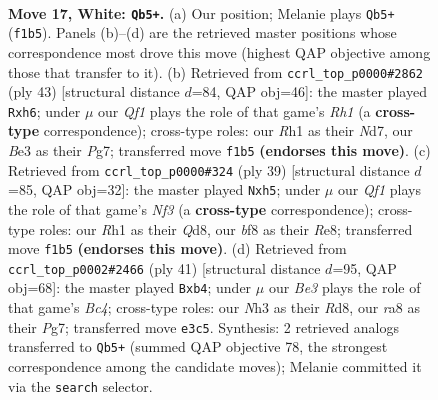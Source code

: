 \documentclass[11pt]{article}
\begin{document}
\clearpage

\begin{figure}[p]\centering
\begin{subfigure}{0.46\textwidth}\centering
\resizebox{\linewidth}{!}{%
\newchessgame
\chessboard[
  setfen={rn1qkbr1/5p2/3p1np1/2pP4/4Pp2/1PN1B2N/P2K4/R4Q1R w q - 0 17},
  showmover=false,
  pgfstyle=straightmove, color=movearrow, markmove={f1-b5}
]}
\caption{}
\end{subfigure}\hfill
\begin{subfigure}{0.46\textwidth}\centering
\resizebox{\linewidth}{!}{%
\newchessgame
\chessboard[
  setfen={4k2r/3n1pp1/rq2p2P/p1bpP2P/3B1P2/8/1PP1NQ2/R3K2R b KQk - 0 22},
  showmover=false,
  pgfstyle=straightmove, color=movearrow, markmove={h8-h6}
]}
\caption{}
\end{subfigure}
\\[4pt]
\begin{subfigure}{0.46\textwidth}\centering
\resizebox{\linewidth}{!}{%
\newchessgame
\chessboard[
  setfen={r2qr1k1/pp3pb1/5np1/3p3P/7P/2PQB3/PP1N1P2/1K1R2R1 b - - 0 20},
  showmover=false,
  pgfstyle=straightmove, color=movearrow, markmove={f6-h5}
]}
\caption{}
\end{subfigure}\hfill
\begin{subfigure}{0.46\textwidth}\centering
\resizebox{\linewidth}{!}{%
\newchessgame
\chessboard[
  setfen={3rk2r/5pp1/pq3n1p/2b1p3/1P4P1/1B5P/1PP1NP2/R3QRK1 b k - 0 21},
  showmover=false,
  pgfstyle=straightmove, color=movearrow, markmove={c5-b4}
]}
\caption{}
\end{subfigure}
\caption{\textbf{Move 17, White: \texttt{Qb5+}.} (a) Our position; Melanie plays \texttt{Qb5+} (\texttt{f1b5}). Panels (b)--(d) are the retrieved master positions whose correspondence most drove this move (highest QAP objective among those that transfer to it). (b) Retrieved from \texttt{ccrl\_top\_p0000\#2862} (ply 43) [structural distance $d$=84, QAP obj=46]: the master played \texttt{Rxh6}; under $\mu$ our \emph{Qf1} plays the role of that game's \emph{Rh1} (a \textbf{cross-type} correspondence); cross-type roles: our \emph{R}h1 as their \emph{N}d7, our \emph{B}e3 as their \emph{P}g7; transferred move \texttt{f1b5} \textbf{(endorses this move)}. (c) Retrieved from \texttt{ccrl\_top\_p0000\#324} (ply 39) [structural distance $d$=85, QAP obj=32]: the master played \texttt{Nxh5}; under $\mu$ our \emph{Qf1} plays the role of that game's \emph{Nf3} (a \textbf{cross-type} correspondence); cross-type roles: our \emph{R}h1 as their \emph{Q}d8, our \emph{b}f8 as their \emph{R}e8; transferred move \texttt{f1b5} \textbf{(endorses this move)}. (d) Retrieved from \texttt{ccrl\_top\_p0002\#2466} (ply 41) [structural distance $d$=95, QAP obj=68]: the master played \texttt{Bxb4}; under $\mu$ our \emph{Be3} plays the role of that game's \emph{Bc4}; cross-type roles: our \emph{N}h3 as their \emph{R}d8, our \emph{r}a8 as their \emph{P}g7; transferred move \texttt{e3c5}. Synthesis: 2 retrieved analogs transferred to \texttt{Qb5+} (summed QAP objective 78, the strongest correspondence among the candidate moves); Melanie committed it via the \texttt{search} selector.}
\label{fig:thought-m32}
\end{figure}
\end{document}
